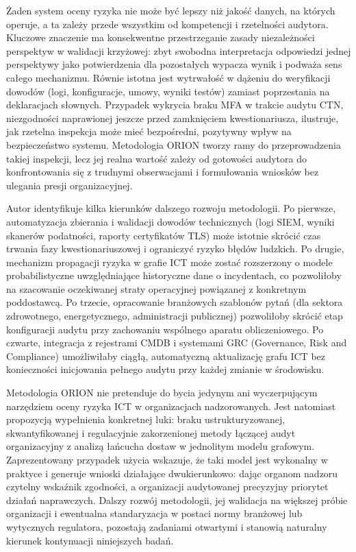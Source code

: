 Żaden system oceny ryzyka nie może być lepszy niż jakość danych, na których operuje, a ta zależy przede wszystkim od kompetencji i rzetelności audytora. Kluczowe znaczenie ma konsekwentne przestrzeganie zasady niezależności perspektyw w walidacji krzyżowej: zbyt swobodna interpretacja odpowiedzi jednej perspektywy jako potwierdzenia dla pozostałych wypacza wynik i podważa sens całego mechanizmu. Równie istotna jest wytrwałość w dążeniu do weryfikacji dowodów (logi, konfiguracje, umowy, wyniki testów) zamiast poprzestania na deklaracjach słownych. Przypadek wykrycia braku MFA w trakcie audytu CTN, niezgodności naprawionej jeszcze przed zamknięciem kwestionariusza, ilustruje, jak rzetelna inspekcja może mieć bezpośredni, pozytywny wpływ na bezpieczeństwo systemu. Metodologia ORION tworzy ramy do przeprowadzenia takiej inspekcji, lecz jej realna wartość zależy od gotowości audytora do konfrontowania się z trudnymi obserwacjami i formułowania wniosków bez ulegania presji organizacyjnej.

Autor identyfikuje kilka kierunków dalszego rozwoju metodologii. Po pierwsze, automatyzacja zbierania i walidacji dowodów technicznych (logi SIEM, wyniki skanerów podatności, raporty certyfikatów TLS) może istotnie skrócić czas trwania fazy kwestionariuszowej i ograniczyć ryzyko błędów ludzkich. Po drugie, mechanizm propagacji ryzyka w grafie ICT może zostać rozszerzony o modele probabilistyczne uwzględniające historyczne dane o incydentach, co pozwoliłoby na szacowanie oczekiwanej straty operacyjnej powiązanej z konkretnym poddostawcą. Po trzecie, opracowanie branżowych szablonów pytań (dla sektora zdrowotnego, energetycznego, administracji publicznej) pozwoliłoby skrócić etap konfiguracji audytu przy zachowaniu wspólnego aparatu obliczeniowego. Po czwarte, integracja z rejestrami CMDB i systemami GRC (Governance, Risk and Compliance) umożliwiłaby ciągłą, automatyczną aktualizację grafu ICT bez konieczności inicjowania pełnego audytu przy każdej zmianie w środowisku.

Metodologia ORION nie pretenduje do bycia jedynym ani wyczerpującym narzędziem oceny ryzyka ICT w organizacjach nadzorowanych. Jest natomiast propozycją wypełnienia konkretnej luki: braku ustrukturyzowanej, skwantyfikowanej i regulacyjnie zakorzenionej metody łączącej audyt organizacyjny z analizą łańcucha dostaw w jednolitym modelu grafowym. Zaprezentowany przypadek użycia wskazuje, że taki model jest wykonalny w praktyce i generuje wnioski działające dwukierunkowo: dając organom nadzoru czytelny wskaźnik zgodności, a organizacji audytowanej precyzyjny priorytet działań naprawczych. Dalszy rozwój metodologii, jej walidacja na większej próbie organizacji i ewentualna standaryzacja w postaci normy branżowej lub wytycznych regulatora, pozostają zadaniami otwartymi i stanowią naturalny kierunek kontynuacji niniejszych badań.
